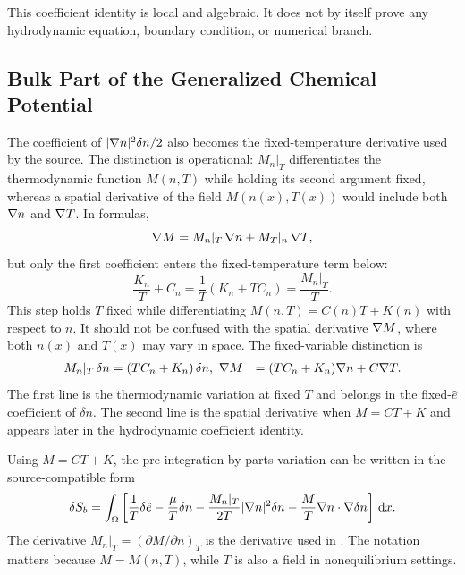 This coefficient identity is local and algebraic.  It does not by itself prove
any hydrodynamic equation, boundary condition, or numerical branch.

\subsection{Bulk Part of the Generalized Chemical Potential}

The coefficient of \(|\nabla n|^2\delta n/2\) also becomes the
fixed-temperature derivative used by the source.  The distinction is operational:
\(M_n|_T\) differentiates the thermodynamic function \(M(n,T)\) while holding
its second argument fixed, whereas a spatial derivative of the field
\(M(n(x),T(x))\) would include both \(\nabla n\) and \(\nabla T\).  In formulas,
\begin{equation}
  \nabla M=M_n|_T\,\nabla n+M_T|_n\,\nabla T,
  \label{eq:iib-spatial-versus-thermo-derivative}
\end{equation}
but only the first coefficient enters the fixed-temperature term below:
\begin{equation}
  \frac{K_n}{T}+C_n=\frac{1}{T}(K_n+TC_n)=\frac{M_n|_T}{T}.
  \label{eq:iib-Mn-fixed-temperature-step}
\end{equation}
This step holds \(T\) fixed while differentiating \(M(n,T)=C(n)T+K(n)\) with
respect to \(n\).  It should not be confused with the spatial derivative
\(\nabla M\), where both \(n(x)\) and \(T(x)\) may vary in space.  The
fixed-variable distinction is
\begin{align}
  M_n|_T\,\delta n
  &= (TC_n+K_n)\,\delta n, \
  \nabla M
  &= (TC_n+K_n)\nabla n+C\nabla T.
  \label{eq:iib-Mn-versus-gradM-linebyline}
\end{align}
The first line is the thermodynamic variation at fixed \(T\) and belongs in
the fixed-\(\hat e\) coefficient of \(\delta n\).  The second line is the
spatial derivative when \(M=CT+K\) and appears later in the hydrodynamic
coefficient identity.

Using \(M=CT+K\), the pre-integration-by-parts variation can be written in the
source-compatible form
\begin{equation}
  \delta S_b
  =
  \int_{\Omega}
  \left[
    \frac{1}{T}\delta\hat e
    -
    \frac{\mu}{T}\delta n
    -
    \frac{M_n|_T}{2T}|\nabla n|^2\delta n
    -
    \frac{M}{T}\nabla n\cdot\nabla\delta n
  \right]\,\mathrm{d} x .
  \label{eq:iib-pre-ibp-variation}
\end{equation}
The derivative \(M_n|_T=(\partial M/\partial n)_T\) is the derivative used in
\eqsrc{2.18}.  The notation matters because \(M=M(n,T)\), while \(T\) is
also a field in nonequilibrium settings.

